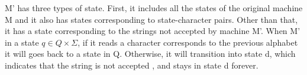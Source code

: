 \documentclass[12pt]{article}
\begin{document}
M' has three types of state. First, it includes all the states of the original machine M and it also has states corresponding to state-character pairs. Other than that, it has a state corresponding to the strings not accepted by machine M'. When M' in a state $q \in Q\times\Sigma$, if it reads a character corresponds to the previous alphabet it will goes back to a state in Q. Otherwise, it will transition into state d, which indicates that the string is not accepted , and stays in state d forever.
\end{document}
